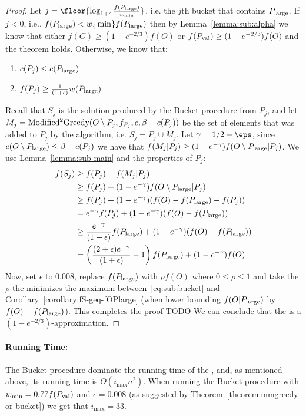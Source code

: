 \begin{proof}
	Let $j = \floor{\log_{1 + \epsilon}\frac{f(\pLarge)}{w_{\min}}}$, i.e. the $j$th bucket that contains $P_{\text{large}}$.
	If $j < 0$, i.e., $f(P_{\text{large}}) < w_\{\min\}f(P_{\text{large}})$ then by Lemma~\ref{lemma:sub:alpha} we know that either $f(G) \geq (1 - e^{-2/3})f(O)$ or $f(P_{\text{val}}) \geq (1 - e^{-2/3})f(O)$ and the theorem holds.
	Otherwise, we know that:
	\begin{enumerate}
		\item $c(P_j) \leq c(P_{\text{large}})$
		\item $f(P_j) \geq \frac{1}{(1 + \epsilon)}w(P_{\text{large}})$
	\end{enumerate}
	Recall that $S_{j}$ is the solution produced by the Bucket procedure from $P_j$, and let $M_j = \text{Modified$^2$Greedy}(O \setminus P_j, f_{P_j}, c, \beta - c(P_j))$ be the set of elements that was added to $P_j$ by the \MGreedy algorithm, i.e. $S_j = P_j \cup M_j$.
	Let $\gamma = 1/2 + \eps$, since $c(O \setminus P_{\text{large}}) \leq \beta - c(P_j)$ we have that $f(M_j|P_j) \geq (1-e^{-\gamma})f(O \setminus P_{\text{large}} | P_j)$.
	We use Lemma~\ref{lemma:sub-main} and the properties of $P_j$:
	\begin{align}
		f(S_{j}) 
		&
		\geq f(P_j) + f(M_j|P_j)
		\\ & 
		\geq f(P_j) + (1-e^{-\gamma})f(O \setminus P_{\text{large}} | P_j)
		\\ & 
		\geq f(P_j) + (1-e^{-\gamma})(f(O) - f(P_{\text{large}}) - f(P_j))
		\\ & 
		= e^{-\gamma}f(P_j) + (1-e^{-\gamma})(f(O) - f(P_{\text{large}}))
		\\ & 
		\geq \frac{e^{-\gamma}}{(1 + \epsilon)}f(P_{\text{large}}) + (1-e^{-\gamma})(f(O) - f(P_{\text{large}}))
		\\ &
		= \left(
			\frac{(2 + \epsilon)e^{-\gamma}}{(1 + \epsilon)} - 1
		\right)
		f(P_{\text{large}})
		+ (1-e^{-\gamma})f(O)
		\label{eq:sub:bucket}
	\end{align}
	Now, set $\epsilon$ to $0.008$, replace $f(P_{\text{large}})$ with $\rho f(O)$ where $0 \leq \rho \leq 1$ and take the $\rho$ the minimizes the maximum between~\ref{eq:sub:bucket} and Corollary~\ref{corollary:fS-geq-fOPlarge} (when lower bounding $f(O|P_{\text{large}})$ by $f(O) - f(P_{\text{large}})$).
	This completes the proof TODO
	We can conclude that the \BOTAlg is a $(1 - e^{-2/3})$-approximation.
\end{proof}


\paragraph{Running Time:}
The Bucket procedure dominate the running time of the \BOTAlg, and, as mentioned above, its running time is $O(i_{\max}n^2)$.
When running the Bucket procedure with $w_{\min} = 0.77f(P_{\text{val}})$ and $\epsilon = 0.008$ (as suggested by Theorem~\ref{theorem:mmgreedy-or-bucket}) we get that $i_{\max} = 33$.

